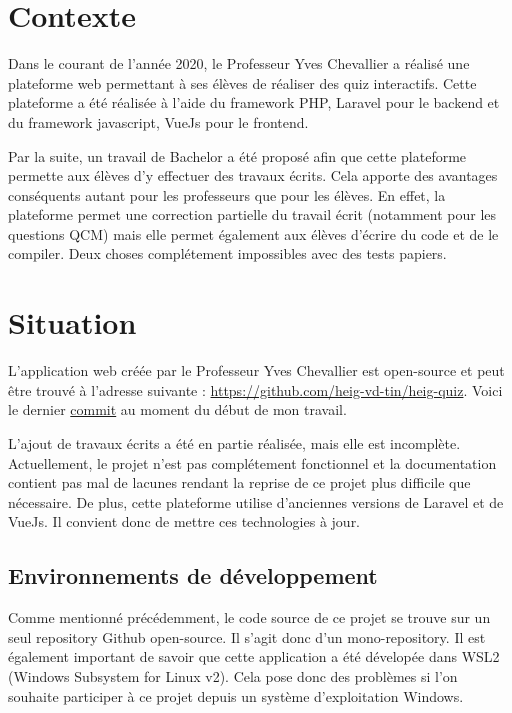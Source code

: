 
\section{Contexte}
Dans le courant de l'année 2020, le Professeur Yves Chevallier a réalisé une plateforme web permettant à ses élèves de réaliser des quiz interactifs. Cette plateforme a été réalisée à l'aide du framework PHP, Laravel \cite{Laravel} pour le backend et du framework javascript, VueJs \cite{Vuejs} pour le frontend.

Par la suite, un travail de Bachelor a été proposé afin que cette plateforme permette aux élèves d'y effectuer des travaux écrits. Cela apporte des avantages conséquents autant pour les professeurs que pour les élèves. En effet, la plateforme permet une correction partielle du travail écrit (notamment pour les questions QCM) mais elle permet également aux élèves d'écrire du code et de le compiler. Deux choses complétement impossibles avec des tests papiers.


\section{Situation}
L'application web créée par le Professeur Yves Chevallier est open-source et peut être trouvé à l'adresse suivante : \url{https://github.com/heig-vd-tin/heig-quiz}. Voici le dernier \href{https://github.com/heig-vd-tin/heig-quiz/commit/28fb1ac5367931f6aa986041fb992c651c9816cd}{commit} au moment du début de mon travail.

L'ajout de travaux écrits a été en partie réalisée, mais elle est incomplète. Actuellement, le projet n'est pas complétement fonctionnel et la documentation contient pas mal de lacunes rendant la reprise de ce projet plus difficile que nécessaire. De plus, cette plateforme utilise d'anciennes versions de Laravel et de VueJs. Il convient donc de mettre ces technologies à jour.

\subsection{Environnements de développement}
Comme mentionné précédemment, le code source de ce projet se trouve sur un seul repository Github open-source. Il s'agit donc d'un mono-repository. Il est également important de savoir que cette application a été dévelopée dans WSL2 (Windows Subsystem for Linux v2). Cela pose donc des problèmes si l'on souhaite participer à ce projet depuis un système d'exploitation Windows.

